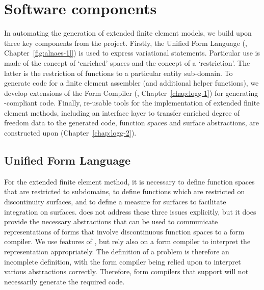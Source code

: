 \section{Software components}

In automating the generation of extended finite element models, we build
upon three key components from the \fenics{} project. Firstly, the Unified
Form Language (\ufl{}, Chapter~\ref{fig:alnaes-1]}) is used to express variational
statements. Particular use is made of the concept of `enriched' spaces
and the \ufl{} concept of a `restriction'. The latter is the restriction
of functions to a particular entity sub-domain.  To generate code for a
finite element assembler (and additional helper functions), we develop
extensions of the \fenics{} Form Compiler (\ffc{}, Chapter~\ref{chap:logg-1})
for generating \ufc{}-compliant code. Finally, re-usable tools for the
implementation of extended finite element methods, including an interface
layer to transfer enriched degree of freedom data to the generated code,
function spaces and surface abstractions, are constructed upon \dolfin{}
(Chapter~\ref{chap:logg-2}).
\subsection{Unified Form Language}

For the extended finite element method, it is necessary to define
function spaces that are restricted to subdomains, to define
functions which are restricted on discontinuity surfaces, and to define a
measure for surfaces to facilitate integration on surfaces.  \ufl{}
does not address these three issues explicitly, but it does provide the
necessary abstractions that can be used to communicate representations of
forms that involve discontinuous function spaces to a form compiler. We
use features of \ufl{}, but rely also on a form compiler to interpret
the \ufl{} representation appropriately.  The \ufl{} definition of a
problem is therefore an incomplete definition, with the form compiler
being relied upon to interpret various abstractions correctly. Therefore,
form compilers that support \ufl{} will not necessarily generate the
required code.

